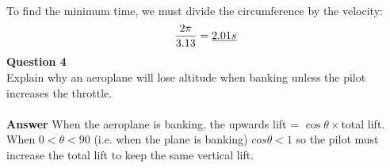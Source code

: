 \documentclass{article}
\begin{document}
\\[3ex]
\noindent
To find the minimum time, we must divide the circumference by the velocity: 
	\[
		\frac{2\pi}{3.13} = \uline{2.01s}
	\]
\textbf{Question 4}\\
Explain why an aeroplane will lose altitude when banking unless the pilot increases the throttle.\\
\\[3ex]
\noindent
\textbf{Answer}
When the aeroplane is banking, the upwards lift = $\cos\theta \times$total lift. When $0 < \theta < 90$ (i.e. when the plane is banking) $cos\theta<1$ so the pilot must increase the total lift to keep the same vertical lift.
\end{document}
